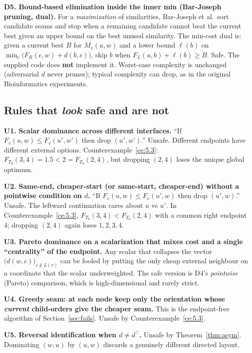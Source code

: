 \documentclass[11pt]{article}
\theoremstyle{plain}
\begin{document}
\textbf{D5. Bound-based elimination inside the inner min (Bar-Joseph pruning,
dual).} For a \emph{maximization} of similarities, Bar-Joseph et al.\ sort
candidate seams and stop when a remaining candidate cannot beat the current
best given an upper bound on the best unused similarity. The min-cost dual is:
given a current best \(B\) for \(M_v(u,w)\) and a lower bound \(\ell(b)\) on
\(\min_c\bigl(F_R(c,w)+d(b,c)\bigr)\), skip \(b\) when
\(F_L(u,b)+\ell(b) \ge B\). Safe. The supplied code does \textbf{not} implement
it. Worst-case complexity is unchanged (adversarial \(d\) never prunes);
typical complexity can drop, as in the original Bioinformatics experiments.

\subsection{Rules that \emph{look} safe and are not}

\textbf{U1. Scalar dominance across different interfaces.} ``If
\(F_v(u,w) \le F_v(u',w')\) then drop \((u',w')\).'' Unsafe. Different endpoints
have different external options. Counterexample~\ref{ce:5.3}:
\(F_{T_0}(3,4) = 1.5 < 2 = F_{T_0}(2,4)\), but dropping \((2,4)\) loses the
unique global optimum.

\textbf{U2. Same-end, cheaper-start (or same-start, cheaper-end) without a
pointwise condition on \(d\).} ``If \(F_v(u,w) \le F_v(u',w)\) then drop
\((u',w)\).'' Unsafe. The leftward continuation cares about \(u\) vs \(u'\).
In Counterexample~\ref{ce:5.3}, \(F_{T_0}(3,4) < F_{T_0}(2,4)\) with a common
right endpoint \(4\); dropping \((2,4)\) again loses \(1,2,3,4\).

\textbf{U3. Pareto dominance on a scalarization that mixes cost and a single
``centrality'' of the endpoint.} Any scalar that collapses the vector
\(\bigl(d(w,c)\bigr)_{c \notin L(v)}\) can be fooled by putting the only cheap
external neighbour on a coordinate that the scalar underweighted. The safe
version is D4's \emph{pointwise} (Pareto) comparison, which is
high-dimensional and rarely strict.

\textbf{U4. Greedy seam: at each node keep only the orientation whose
\emph{current} child-orders give the cheaper seam.} This is the endpoint-free
algorithm of Section~\ref{sec:fails}. Unsafe by
Counterexample~\ref{ce:5.3}.

\textbf{U5. Reversal identification when \(d \ne d^\top\).} Unsafe by
Theorem~\ref{thm:asym}. Dominating \((w,u)\) by \((u,w)\) discards a genuinely
different directed layout.
\end{document}
